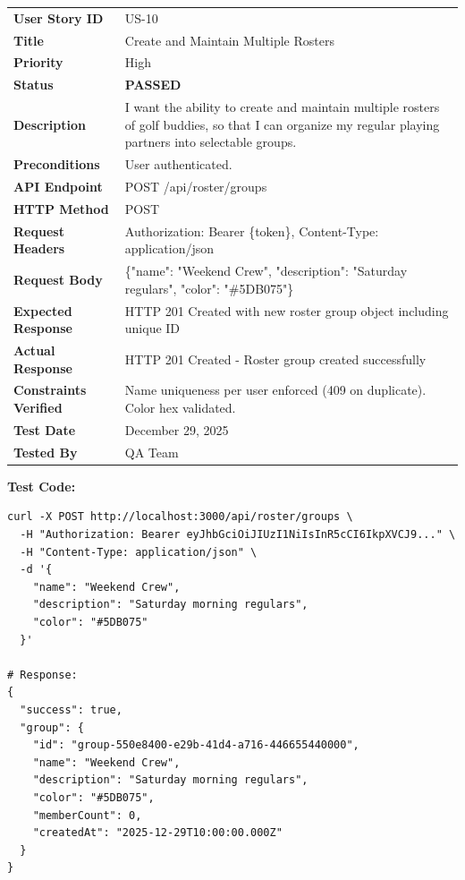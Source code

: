 \documentclass[11pt,a4paper]{article}
\newcommand{\passed}{\textcolor{pass}{\textbf{PASSED}}}
\begin{document}
\begin{tabularx}{\textwidth}{|p{3.2cm}|Y|}
\hline
{}
 \\
\hline
\textbf{User Story ID} & US-10 \\
\hline
\textbf{Title} & Create and Maintain Multiple Rosters \\
\hline
\textbf{Priority} & High \\
\hline
\textbf{Status} & \passed \\
\hline
\textbf{Description} & I want the ability to create and maintain multiple rosters of golf buddies, so that I can organize my regular playing partners into selectable groups. \\
\hline
\textbf{Preconditions} & User authenticated. \\
\hline
\textbf{API Endpoint} & POST /api/roster/groups \\
\hline
\textbf{HTTP Method} & POST \\
\hline
\textbf{Request Headers} & Authorization: Bearer \{token\}, Content-Type: application/json \\
\hline
\textbf{Request Body} & \{"name": "Weekend Crew", "description": "Saturday regulars", "color": "\#5DB075"\} \\
\hline
\textbf{Expected Response} & HTTP 201 Created with new roster group object including unique ID \\
\hline
\textbf{Actual Response} & HTTP 201 Created - Roster group created successfully \\
\hline
\textbf{Constraints Verified} & Name uniqueness per user enforced (409 on duplicate). Color hex validated. \\
\hline
\textbf{Test Date} & December 29, 2025 \\
\hline
\textbf{Tested By} & QA Team \\
\hline
\end{tabularx}

\vspace{0.3cm}
\textbf{Test Code:}
\begin{lstlisting}
curl -X POST http://localhost:3000/api/roster/groups \
  -H "Authorization: Bearer eyJhbGciOiJIUzI1NiIsInR5cCI6IkpXVCJ9..." \
  -H "Content-Type: application/json" \
  -d '{
    "name": "Weekend Crew",
    "description": "Saturday morning regulars",
    "color": "#5DB075"
  }'

# Response:
{
  "success": true,
  "group": {
    "id": "group-550e8400-e29b-41d4-a716-446655440000",
    "name": "Weekend Crew",
    "description": "Saturday morning regulars",
    "color": "#5DB075",
    "memberCount": 0,
    "createdAt": "2025-12-29T10:00:00.000Z"
  }
}
\end{lstlisting}
\end{document}
